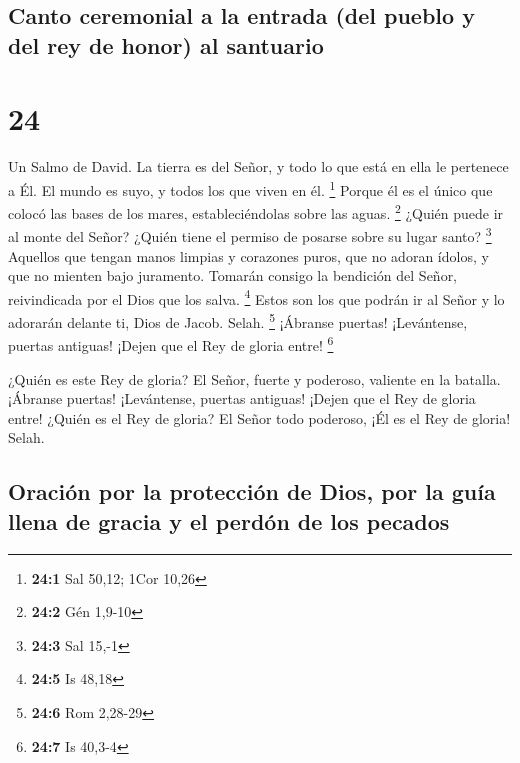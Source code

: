 \hypertarget{canto-ceremonial-a-la-entrada-del-pueblo-y-del-rey-de-honor-al-santuario}{%
\subsection{Canto ceremonial a la entrada (del pueblo y del rey de
honor) al
santuario}\label{canto-ceremonial-a-la-entrada-del-pueblo-y-del-rey-de-honor-al-santuario}}

\hypertarget{section-23}{%
\section{24}\label{section-23}}

Un Salmo de David.  La tierra es del Señor, y todo lo que
está en ella le pertenece a Él. El mundo es suyo, y todos los que viven
en él. \footnote{\textbf{24:1} Sal 50,12; 1Cor 10,26} 
Porque él es el único que colocó las bases de los mares,
estableciéndolas sobre las aguas. \footnote{\textbf{24:2} Gén 1,9-10}
 ¿Quién puede ir al monte del Señor? ¿Quién tiene el permiso
de posarse sobre su lugar santo? \footnote{\textbf{24:3} Sal 15,-1}
 Aquellos que tengan manos limpias y corazones puros, que no
adoran ídolos, y que no mienten bajo juramento.  Tomarán
consigo la bendición del Señor, reivindicada por el Dios que los salva.
\footnote{\textbf{24:5} Is 48,18}  Estos son los que podrán
ir al Señor y lo adorarán delante ti, Dios de Jacob. Selah. \footnote{\textbf{24:6}
  Rom 2,28-29}  ¡Ábranse puertas! ¡Levántense, puertas
antiguas! ¡Dejen que el Rey de gloria entre! \footnote{\textbf{24:7} Is
  40,3-4}

 ¿Quién es este Rey de gloria? El Señor, fuerte y poderoso,
valiente en la batalla.  ¡Ábranse puertas! ¡Levántense,
puertas antiguas! ¡Dejen que el Rey de gloria entre! 
¿Quién es el Rey de gloria? El Señor todo poderoso, ¡Él es el Rey de
gloria! Selah.

\hypertarget{oraciuxf3n-por-la-protecciuxf3n-de-dios-por-la-guuxeda-llena-de-gracia-y-el-perduxf3n-de-los-pecados}{%
\subsection{Oración por la protección de Dios, por la guía llena de
gracia y el perdón de los
pecados}\label{oraciuxf3n-por-la-protecciuxf3n-de-dios-por-la-guuxeda-llena-de-gracia-y-el-perduxf3n-de-los-pecados}}

